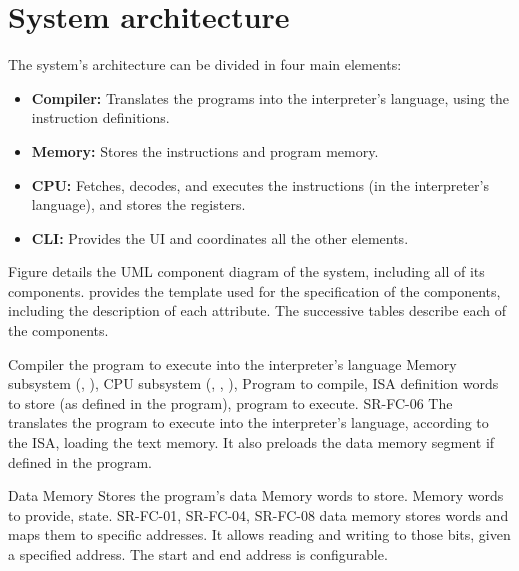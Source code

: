 \section{System architecture}\label{sec:architecture}
The system's architecture can be divided in four main elements:
\begin{itemize}
  \item \textbf{Compiler:} Translates the  programs into the \gls{interpreter}'s language, using the \gls{instruction} definitions.
  \item \textbf{Memory:} Stores the \glspl{instruction} and program memory.
  \item \textbf{\gls{CPU}:} Fetches, decodes, and executes the \glspl{instruction} (in the interpreter's language), and stores the \glspl{register}.
  \item \textbf{\gls{CLI}:} Provides the \gls{UI} and coordinates all the other elements.
\end{itemize}

Figure  details the UML component diagram \parencite{Cook2017} of the system, including all of its components.  provides the template used for the specification of the components, including the description of each attribute. The successive tables describe each of the components.




\begin{component}{Compiler}
  { the program to execute into the interpreter's language}  %
  {Memory subsystem (, ), CPU subsystem (, , ), }  %
  {Program to compile, \gls{ISA} definition}  %
  { words to store (as defined in the program), program to execute.}  %
  {SR-FC-06}  %
  The  translates the  program to execute into the interpreter's language, according to the \gls{ISA}, loading the \gls{text memory}. It also preloads the \gls{data memory} segment if defined in the program.
\end{component}

\begin{component}{Data Memory}
  {Stores the program's data}  %
  {\NA}  %
  {Memory \glspl{word} to store.}  %
  {Memory \glspl{word} to provide, state.}  %
  {SR-FC-01, SR-FC-04, SR-FC-08}  %
  \Gls{data memory} stores \glspl{word} and maps them to specific addresses. It allows reading and writing to those bits, given a specified address. The start and end address is configurable.
\end{component}

